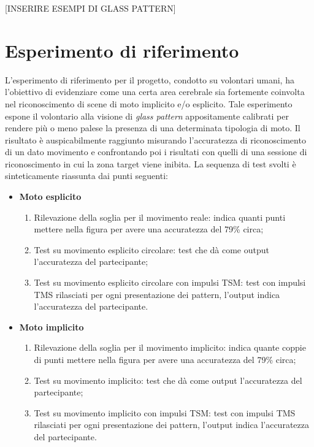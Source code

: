 [INSERIRE ESEMPI DI GLASS PATTERN] 

\section{Esperimento di riferimento}

L'esperimento di riferimento per il progetto, condotto su volontari umani, ha l'obiettivo di evidenziare come una certa area cerebrale sia fortemente coinvolta nel riconoscimento di scene di moto implicito e/o esplicito. Tale esperimento espone il volontario alla visione di \textit{glass pattern} appositamente calibrati per rendere più o meno palese la presenza di una determinata tipologia di moto. Il risultato è auspicabilmente raggiunto misurando l'accuratezza di riconoscimento di un dato movimento e confrontando poi i risultati con quelli di una sessione di riconoscimento in cui la zona target viene inibita. La sequenza di test svolti è sinteticamente riassunta dai punti seguenti:

\begin{itemize}
	\item \textbf{Moto esplicito}
	\begin{enumerate}
		\item Rilevazione della soglia per il movimento reale: indica quanti punti mettere nella figura per avere una accuratezza del 79\% circa;
		\item Test su movimento esplicito circolare: test che dà come output l'accuratezza del partecipante;
		\item Test su movimento esplicito circolare con impulsi TSM: test con impulsi TMS rilasciati per ogni presentazione dei pattern, l'output indica l'accuratezza del partecipante.
	\end{enumerate}

	\item \textbf{Moto implicito}
	\begin{enumerate}
		\item Rilevazione della soglia per il movimento implicito: indica quante coppie di punti mettere nella figura per avere una accuratezza del 79\% circa;
		\item Test su movimento implicito:  test che dà come output l'accuratezza del partecipante;
		\item Test su movimento implicito con impulsi TSM:  test con impulsi TMS rilasciati per ogni presentazione dei pattern, l'output indica l'accuratezza del partecipante.
	\end{enumerate}
\end{itemize}

